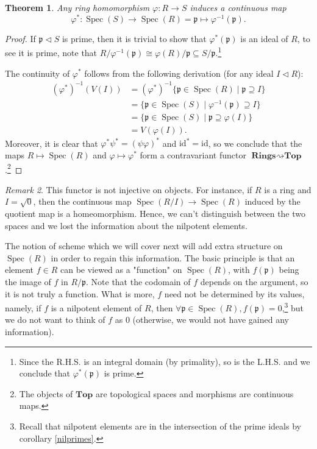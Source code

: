 \documentclass{tufte-handout} %
\newtheorem{thm}{Theorem}
\theoremstyle{definition}
\theoremstyle{remark}
\newtheorem{rem}[thm]{Remark}
\newcommand{\lp}{{\mathfrak{p}}}
\DeclareMathOperator{\spec}{Spec}
\begin{document}
\begin{thm}
	Any ring homomorphism $\varphi: R\rightarrow S$ induces a continuous map \[\varphi^*: \spec(S) \rightarrow \spec(R) = \lp \mapsto \varphi^{-1}(\lp).\]
\end{thm}
\begin{proof}
	If $\lp \lhd S$ is prime, then it is trivial to show that $\varphi^*(\lp)$ is an ideal of $R$, to see it is prime, note that $R/\varphi^{-1}(\lp) \cong \varphi(R)/\lp \subseteq S/\lp$.\footnote{Since the R.H.S. is an integral domain (by primality), so is the L.H.S. and we conclude that $\varphi^*(\lp)$ is prime.}
	
	The continuity of $\varphi^*$ follows from the following derivation (for any ideal $I \lhd R$):
	\begin{align*}
		(\varphi^*)^{-1}(V(I)) &= (\varphi^*)^{-1}\{\lp \in \spec(R) \mid \lp \supseteq I\}\\
		&= \{\lp \in \spec(S) \mid \varphi^{-1}(\lp) \supseteq I\}\\ 
		&= \{\lp \in \spec(S) \mid \lp \supseteq \varphi(I)\}\\ 
		&= V(\varphi(I)).
	\end{align*} 
	Moreover, it is clear that $\varphi^*\psi^* = (\psi\varphi)^*$ and $\text{id}^* = \text{id}$, so we conclude that the maps $R \mapsto \spec(R)$ and $\varphi \mapsto \varphi^*$ form a contravariant functor $\textbf{Rings} \rightsquigarrow \textbf{Top}$.\footnote{The objects of $\textbf{Top}$ are topological spaces and morphisms are continuous maps.}
\end{proof}
\begin{rem}
	This functor is not injective on objects. For instance, if $R$ is a ring and $I = \sqrt{0}$, then the continuous map $\spec(R/I) \rightarrow \spec(R)$ induced by the quotient map is a homeomorphism. Hence, we can't distinguish between the two spaces and we lost the information about the nilpotent elements. 
\end{rem}
The notion of scheme which we will cover next will add extra structure on $\spec(R)$ in order to regain this information. The basic principle is that an element $f \in R$ can be viewed as a "function" on $\spec(R)$, with $f(\lp)$ being the image of $f$ in $R/\lp$. Note that the codomain of $f$ depends on the argument, so it is not truly a function. What is more, $f$ need not be determined by its values, namely, if $f$ is a nilpotent element of $R$, then $\forall \lp \in \spec(R), f(\lp) = 0$,\footnote{Recall that nilpotent elements are in the intersection of the prime ideals by corollary \ref{nilprimes}.} but we do not want to think of $f$ as $0$ (otherwise, we would not have gained any information).
\end{document}
